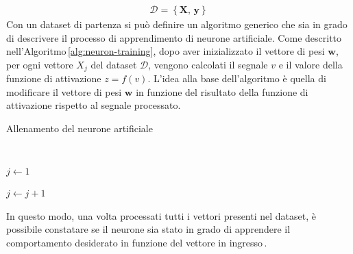 % 
\begin{gather*}
    \mathcal{D} = \left\{ \mathbf{X},\, \mathbf{y} \right\}  
\end{gather*}
% 
Con un dataset di partenza si può definire un algoritmo generico che sia in grado di descrivere il processo di apprendimento di neurone artificiale. Come descritto nell'Algoritmo\,\ref{alg:neuron-training}, dopo aver inizializzato il vettore di pesi $\mathbf{w}$, per ogni vettore $X_j$ del dataset $\mathcal{D}$, vengono calcolati il segnale $v$ e il valore della funzione di attivazione $z = f(v)$. L'idea alla base dell'algoritmo è quella di modificare il vettore di pesi $\mathbf{w}$ in funzione del risultato della funzione di attivazione rispetto al segnale processato.
% 
\begin{algorithm}[ht]
    \caption{Allenamento del neurone artificiale}\label{alg:neuron-training}
    \begin{algorithmic}
        \STATE\,

        \STATE$j \gets 1$
        
            \STATE{}
            \STATE{}
            \STATE{}
            \STATE$j \gets j + 1$
        \ENDWHILE\,
    \end{algorithmic}
\end{algorithm}
% 
\noindent In questo modo, una volta processati tutti i vettori presenti nel dataset, è possibile constatare se il neurone sia stato in grado di apprendere il comportamento desiderato in funzione del vettore in ingresso\,\cite{flasinski2016introduction}.

